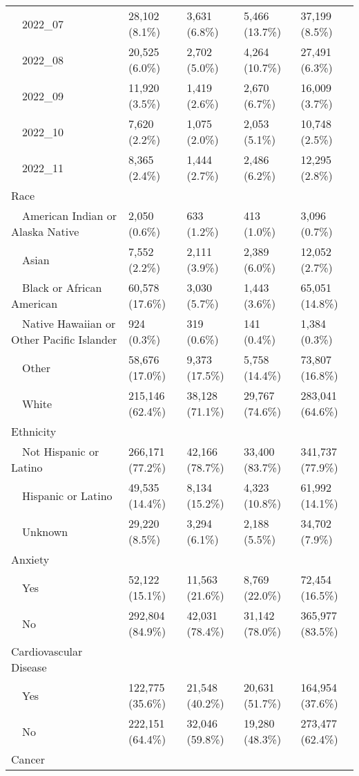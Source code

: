 \begin{longtable}{lllll}
    2022\_07 & 28,102 (8.1\%) & 3,631 (6.8\%) & 5,466 (13.7\%) & 37,199 (8.5\%) \\ 
    2022\_08 & 20,525 (6.0\%) & 2,702 (5.0\%) & 4,264 (10.7\%) & 27,491 (6.3\%) \\ 
    2022\_09 & 11,920 (3.5\%) & 1,419 (2.6\%) & 2,670 (6.7\%) & 16,009 (3.7\%) \\ 
    2022\_10 & 7,620 (2.2\%) & 1,075 (2.0\%) & 2,053 (5.1\%) & 10,748 (2.5\%) \\ 
    2022\_11 & 8,365 (2.4\%) & 1,444 (2.7\%) & 2,486 (6.2\%) & 12,295 (2.8\%) \\ 
  Race &  &  &  &  \\ 
    American Indian or Alaska Native & 2,050 (0.6\%) & 633 (1.2\%) & 413 (1.0\%) & 3,096 (0.7\%) \\ 
    Asian & 7,552 (2.2\%) & 2,111 (3.9\%) & 2,389 (6.0\%) & 12,052 (2.7\%) \\ 
    Black or African American & 60,578 (17.6\%) & 3,030 (5.7\%) & 1,443 (3.6\%) & 65,051 (14.8\%) \\ 
    Native Hawaiian or Other Pacific Islander & 924 (0.3\%) & 319 (0.6\%) & 141 (0.4\%) & 1,384 (0.3\%) \\ 
    Other & 58,676 (17.0\%) & 9,373 (17.5\%) & 5,758 (14.4\%) & 73,807 (16.8\%) \\ 
    White & 215,146 (62.4\%) & 38,128 (71.1\%) & 29,767 (74.6\%) & 283,041 (64.6\%) \\ 
  Ethnicity &  &  &  &  \\ 
    Not Hispanic or Latino & 266,171 (77.2\%) & 42,166 (78.7\%) & 33,400 (83.7\%) & 341,737 (77.9\%) \\ 
    Hispanic or Latino & 49,535 (14.4\%) & 8,134 (15.2\%) & 4,323 (10.8\%) & 61,992 (14.1\%) \\ 
    Unknown & 29,220 (8.5\%) & 3,294 (6.1\%) & 2,188 (5.5\%) & 34,702 (7.9\%) \\ 
  Anxiety &  &  &  &  \\ 
    Yes & 52,122 (15.1\%) & 11,563 (21.6\%) & 8,769 (22.0\%) & 72,454 (16.5\%) \\ 
    No & 292,804 (84.9\%) & 42,031 (78.4\%) & 31,142 (78.0\%) & 365,977 (83.5\%) \\ 
  Cardiovascular Disease &  &  &  &  \\ 
    Yes & 122,775 (35.6\%) & 21,548 (40.2\%) & 20,631 (51.7\%) & 164,954 (37.6\%) \\ 
    No & 222,151 (64.4\%) & 32,046 (59.8\%) & 19,280 (48.3\%) & 273,477 (62.4\%) \\ 
  Cancer &  &  &  &  \\ 

\end{longtable}
